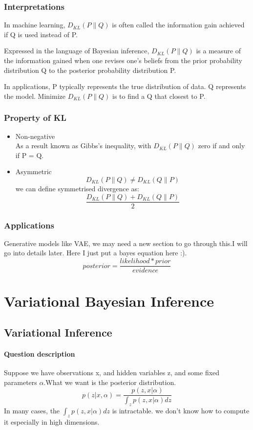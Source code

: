 \documentclass{article}
\begin{document}
\subsubsection{Interpretations}
In machine learning, $D_{KL}(P \parallel Q)$ is often called the information gain achieved if Q is used instead of P.


Expressed in the language of Bayesian inference, $D_{KL}(P \parallel Q)$ is a measure of the information gained when one revises one's beliefs from the prior probability distribution Q to the posterior probability distribution P.

In applications, P typically represents the true distribution of data. Q represents the model. Minimize $D_{KL}(P \parallel Q)$ is to find a Q that closest to P.  
\subsubsection{Property of KL}
\begin{itemize}
\item Non-negative \\
As a result known as Gibbs's inequality, with $D_{KL}(P \parallel Q)$ zero if and only if P = Q.
\item Asymmetric
$$D_{KL}(P \parallel Q) \neq D_{KL}(Q \parallel P)$$
we can define symmetrised divergence as:
$$\frac{D_{KL}(P \parallel Q) + D_{KL}(Q \parallel P)}{2}$$
\end{itemize}
\subsubsection{Applications}
Generative models like VAE, we may need a new section to go through this.I will go into details later. Here I just put a bayes equation here :). 
$$posterior=\frac{likelihood * prior}{evidence}$$

\section{Variational Bayesian Inference}
\subsection{Variational Inference}
\paragraph{Question description} Suppose we have observations x, and hidden variables z, and some fixed parameters $\alpha$.What we want is the posterior distribution.
$$p(z|x,\alpha)=\frac{p(z,x|\alpha)}{\int_z p(z,x|\alpha)dz}$$
In many cases, the $\int_z p(z,x|\alpha)dz$ is intractable. we don't know how to compute it especially in high dimensions.
\end{document}
